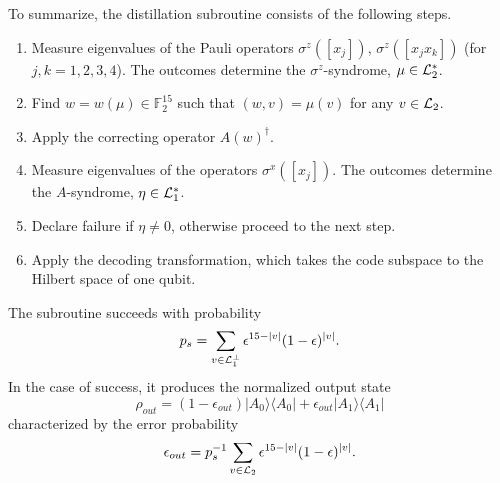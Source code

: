 \documentclass[pra,twocolumn,showpacs]{revtex4}
\newcommand{\FF}{\mathbb{F}}
\newcommand{\calL}{{\cal L }}
\newcommand{\la}{\langle}
\newcommand{\ra}{\rangle}
\newcommand{\ep}{\epsilon}
\newcommand{\sx}{\sigma^x}
\newcommand{\sz}{\sigma^z}
\begin{document}
To summarize, the distillation subroutine consists of the following steps.
\begin{enumerate}
\item Measure eigenvalues of the Pauli operators $\sz([x_j])$, $\sz([x_jx_k])$ (for
$j,k=1,2,3,4$).  The outcomes determine the $\sz$-syndrome, $\mu\in\calL_2^*$.
\item Find $w=w(\mu)\in\FF_2^{15}$ such that $(w,v)=\mu(v)$ for any
$v\in\calL_{2}$.
\item Apply the correcting operator $A(w)^{\dagger}$.
\item Measure eigenvalues of the operators $\sx([x_j])$.  The outcomes
determine the $A$-syndrome, $\eta\in\calL_1^*$.
\item Declare failure if $\eta\ne 0$, otherwise proceed to the next
step.
\item Apply the decoding transformation, which takes the code subspace to the
Hilbert space of one qubit.
\end{enumerate}
The subroutine succeeds with probability
\begin{equation}\label{probsuccess}
p_{s}=\sum_{v\in \calL_1^\perp} \ep^{15-|v|}(1-\ep)^{|v|}.
\end{equation}
In the case of success, it produces the normalized output state
\begin{equation}\label{rho_out}
\rho_{out} = (1-\ep_{out})|A_0\ra\la A_0| + \ep_{out}|A_1\ra\la A_1|
\end{equation}
characterized by the error probability
\begin{equation}\label{errprob}
\ep_{out}=p_{s}^{-1}\sum_{v\in \calL_2} \ep^{15-|v|}(1-\ep)^{|v|}.
\end{equation}
\end{document}
